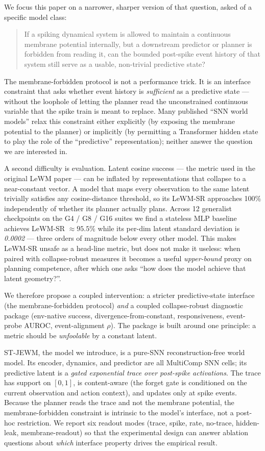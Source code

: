 \documentclass{article}
\begin{document}
We focus this paper on a narrower, sharper version of that question, asked of a specific model class:

\begin{quote}
If a spiking dynamical system is allowed to maintain a continuous
membrane potential internally, but a downstream predictor or planner is
forbidden from reading it, can the bounded post-spike event history of
that system still serve as a usable, non-trivial predictive state?
\end{quote}

The membrane-forbidden protocol is not a performance trick. It is an interface constraint that asks whether event history is \emph{sufficient} as a predictive state --- without the loophole of letting the planner read the unconstrained continuous variable that the spike train is meant to replace. Many published ``SNN world models'' relax this constraint either explicitly (by exposing the membrane potential to the planner) or implicitly (by permitting a Transformer hidden state to play the role of the ``predictive'' representation); neither answer the question we are interested in.

A second difficulty is evaluation. Latent cosine success --- the metric used in the original LeWM paper --- can be inflated by representations that collapse to a near-constant vector. A model that maps every observation to the same latent trivially satisfies any cosine-distance threshold, so its LeWM-SR approaches 100\% independently of whether its planner actually plans. Across 12 generalist checkpoints on the G4 / G8 / G16 suites we find a stateless MLP baseline achieves LeWM-SR $\approx 95.5\%$ while its per-dim latent standard deviation is \emph{0.0002} --- three orders of magnitude below every other model. This makes LeWM-SR unsafe as a head-line metric, but does not make it useless: when paired with collapse-robust measures it becomes a useful \emph{upper-bound} proxy on planning competence, after which one asks ``how does the model achieve that latent geometry?''.

We therefore propose a coupled intervention: a stricter predictive-state interface (the membrane-forbidden protocol) \emph{and} a coupled collapse-robust diagnostic package (env-native success, divergence-from-constant, responsiveness, event-probe AUROC, event-alignment $\rho$). The package is built around one principle: a metric should be \emph{unfoolable} by a constant latent.

ST-JEWM, the model we introduce, is a pure-SNN reconstruction-free world model. Its encoder, dynamics, and predictor are all MultiComp SNN cells; its predictive latent is a \emph{gated exponential trace over post-spike activations}. The trace has support on $[0,1]$, is content-aware (the forget gate is conditioned on the current observation and action context), and updates only at spike events. Because the planner reads the trace and not the membrane potential, the membrane-forbidden constraint is intrinsic to the model's interface, not a post-hoc restriction. We report six readout modes (trace, spike, rate, no-trace, hidden-leak, membrane-readout) so that the experimental design can answer ablation questions about \emph{which} interface property drives the empirical result.
\end{document}
